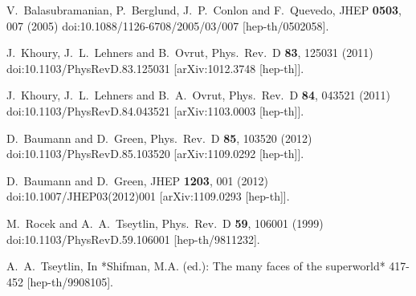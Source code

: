 \documentclass[12pt]{article}
\begin{document}
\begin{thebibliography}{99}
  V.~Balasubramanian, P.~Berglund, J.~P.~Conlon and F.~Quevedo,
  JHEP {\bf 0503}, 007 (2005)
  doi:10.1088/1126-6708/2005/03/007
  [hep-th/0502058].


  J.~Khoury, J.~L.~Lehners and B.~Ovrut,
  Phys.\ Rev.\ D {\bf 83}, 125031 (2011)
  doi:10.1103/PhysRevD.83.125031
  [arXiv:1012.3748 [hep-th]].


  J.~Khoury, J.~L.~Lehners and B.~A.~Ovrut,
  Phys.\ Rev.\ D {\bf 84}, 043521 (2011)
  doi:10.1103/PhysRevD.84.043521
  [arXiv:1103.0003 [hep-th]].


  D.~Baumann and D.~Green,
  Phys.\ Rev.\ D {\bf 85}, 103520 (2012)
  doi:10.1103/PhysRevD.85.103520
  [arXiv:1109.0292 [hep-th]].


  D.~Baumann and D.~Green,
  JHEP {\bf 1203}, 001 (2012)
  doi:10.1007/JHEP03(2012)001
  [arXiv:1109.0293 [hep-th]].


  M.~Rocek and A.~A.~Tseytlin,
  Phys.\ Rev.\ D {\bf 59}, 106001 (1999)
  doi:10.1103/PhysRevD.59.106001
  [hep-th/9811232].


  A.~A.~Tseytlin,
  In *Shifman, M.A. (ed.): The many faces of the superworld* 417-452
  [hep-th/9908105].



\end{thebibliography}
\end{document}
